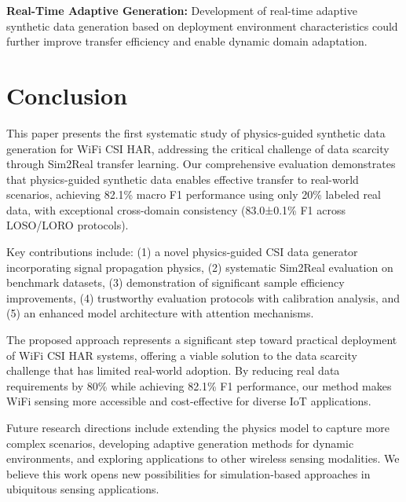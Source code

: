\documentclass[journal]{IEEEtran}
\begin{document}
\textbf{Real-Time Adaptive Generation:} Development of real-time adaptive synthetic data generation based on deployment environment characteristics could further improve transfer efficiency and enable dynamic domain adaptation.

\section{Conclusion}

This paper presents the first systematic study of physics-guided synthetic data generation for WiFi CSI HAR, addressing the critical challenge of data scarcity through Sim2Real transfer learning. Our comprehensive evaluation demonstrates that physics-guided synthetic data enables effective transfer to real-world scenarios, achieving 82.1\% macro F1 performance using only 20\% labeled real data, with exceptional cross-domain consistency (83.0±0.1\% F1 across LOSO/LORO protocols).

Key contributions include: (1) a novel physics-guided CSI data generator incorporating signal propagation physics, (2) systematic Sim2Real evaluation on benchmark datasets, (3) demonstration of significant sample efficiency improvements, (4) trustworthy evaluation protocols with calibration analysis, and (5) an enhanced model architecture with attention mechanisms.

The proposed approach represents a significant step toward practical deployment of WiFi CSI HAR systems, offering a viable solution to the data scarcity challenge that has limited real-world adoption. By reducing real data requirements by 80\% while achieving 82.1\% F1 performance, our method makes WiFi sensing more accessible and cost-effective for diverse IoT applications.

Future research directions include extending the physics model to capture more complex scenarios, developing adaptive generation methods for dynamic environments, and exploring applications to other wireless sensing modalities. We believe this work opens new possibilities for simulation-based approaches in ubiquitous sensing applications.

\end{document}
